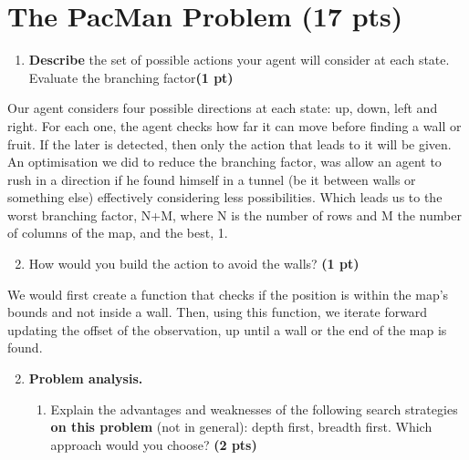 \documentclass[11pt,a4paper]{../template/report}
\begin{document}
\section{The 
PacMan Problem (17 pts)}

\begin{enumerate}
\setcounter{enumi}{1}
\begin{enumerate}
\item \textbf{Describe} the set of possible actions your agent will consider at each state. Evaluate the branching factor\textbf{(1 pt)}
\end{enumerate}
  
\end{enumerate}

\begin{answer}
Our agent considers four possible directions at each state: up, down, left and right. For each one, the agent checks
how far it can move before finding a wall or fruit. If the later is detected, then only the action that leads to it will be given.
An optimisation we did to reduce the branching factor, was allow an agent to rush in a direction if he found himself in a tunnel (be it between walls or something else) effectively considering less possibilities.
Which leads us to the worst branching factor, N+M, where N is the number of rows and M the number of columns of the map, and the best, 1.
\end{answer}
\begin{enumerate}
\setcounter{enumi}{1}
\begin{enumerate}
\setcounter{enumii}{1}
    \item  How would you build the action to avoid the walls? \textbf{(1 pt)}
\end{enumerate}
  
\end{enumerate}

\begin{answer}
We would first create a function that checks if the position is within the map's bounds and not inside a wall. Then, using this function, we iterate forward
updating the offset of the observation, up until a wall or the end of the map is found. 
\end{answer}



\begin{enumerate}
\setcounter{enumi}{1}
    \item \textbf{Problem analysis.}
    \begin{enumerate}
        \item Explain the advantages and weaknesses of the following search strategies \textbf{on this problem} (not in general): depth first, breadth first. Which approach would you choose? \textbf{(2 pts)}
    \end{enumerate}
\end{enumerate}
\end{document}
